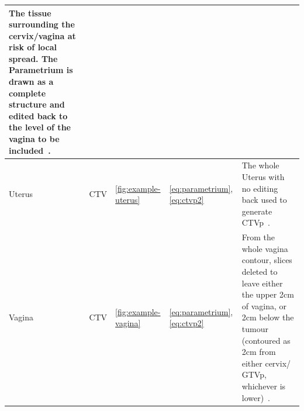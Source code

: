 \documentclass[11pt,twoside]{report}
\begin{document}
\begin{landscape}
\begin{table}[h!]
\begin{tabularx}{\linewidth}{l l l l X}
      The tissue surrounding the cervix/vagina at risk of local spread. The Parametrium is drawn as a complete structure and edited back to the level of the vagina to be included~\cite{AMLART-data}. \\
      \midrule
      Uterus & CTV & \ref{fig:example-uterus} & \ref{eq:parametrium}, \ref{eq:ctvp2} & The whole Uterus with no editing back used to generate CTVp~\cite{AMLART-data}. \\
      \midrule
      Vagina & CTV & \ref{fig:example-vagina} & \ref{eq:parametrium}, \ref{eq:ctvp2} & From the whole vagina contour, slices deleted to leave either the upper 2cm of vagina, or 2cm below the tumour (contoured as 2cm from either cervix/ GTVp, whichever is lower)~\cite{AMLART-data}. \\
      \bottomrule
    \end{tabularx}
  \end{table}
  

\end{landscape}
\end{document}
